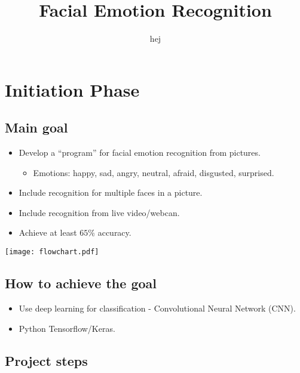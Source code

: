 
\usepackage{amsmath}
\usepackage[utf8]{inputenc}
\usepackage{graphicx}
\usepackage{multicol}


\author{hej}
\title{Facial Emotion Recognition}
\maketitle{}

\section{Initiation Phase}
\subsection{Main goal}
\begin{multicols}{2}
\begin{itemize}
\item Develop a ``program'' for facial emotion recognition from pictures.
    \begin{itemize}
    \item Emotions: happy, sad, angry, neutral, afraid, disgusted, surprised. 
    \end{itemize}
\item Include recognition for multiple faces in a picture.
\item Include recognition from live video/webcan.
\item Achieve at least $65$\% accuracy.
\end{itemize}

\columnbreak

    \centering
    \texttt{[image: flowchart.pdf]}
\end{multicols}

\subsection{How to achieve the goal}
\begin{itemize}
\item Use deep learning for classification - Convolutional Neural Network (CNN).
\item Python Tensorflow/Keras.
\end{itemize}

\subsection{Project steps}

